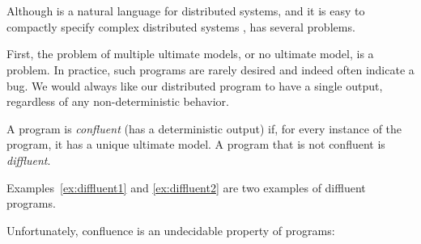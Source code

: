 \section{\slang}
\label{sec:confluence}

Although \lang is a natural language for distributed systems, and it is easy to compactly specify complex distributed systems , \lang has several problems.

First, the problem of multiple ultimate models, or no ultimate model, is a problem.  In practice, such programs are rarely desired and indeed often indicate a bug.  We would always like our distributed program to have a single output, regardless of any non-deterministic behavior.

\begin{definition}
A \lang program is {\em confluent} (has a deterministic output) if, for every instance of the program, it has a unique ultimate model.  A program that is not confluent is {\em diffluent}.
\end{definition}

Examples~\ref{ex:diffluent1} and \ref{ex:diffluent2} are two examples of diffluent programs.

Unfortunately, confluence is an undecidable property of \lang programs:

